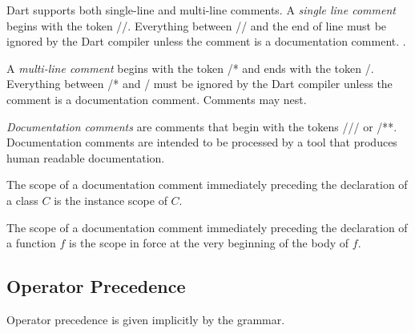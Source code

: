 \documentclass{article}
\newcommand{\code}[1]{{\sf #1}}
\begin{document}
\LMHash{}
Dart supports both single-line and multi-line comments. A {\em single line comment} begins with the token \code{//}. Everything between \code{//} and the end of line must be ignored by the Dart compiler unless the comment is a documentation comment. . 

\LMHash{}
A {\em multi-line comment} begins with the token \code{/*} and ends with the token \code{*/}.  Everything between \code{/}* and \code{*}/ must be ignored by the Dart compiler unless the comment is a documentation comment. Comments may nest. 

\LMHash{}
{\em Documentation comments} are comments that begin with the tokens  \code{///} or  \code{/**}. Documentation comments are intended to be processed by a tool that produces human readable documentation. 


\LMHash{}
The scope of a documentation comment immediately preceding the declaration of a class $C$ is the instance scope of $C$.

\LMHash{}
The scope of a documentation comment immediately preceding the declaration of a function $f$  is the  scope in force at the very beginning of the body of $f$.





\subsection{Operator Precedence}

\LMHash{}
Operator precedence is given implicitly by the grammar.
\end{document}
